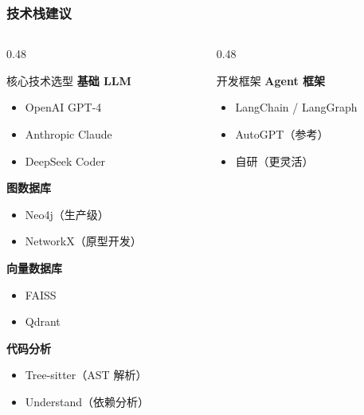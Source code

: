\documentclass[aspectratio=169,10pt]{beamer}
\begin{document}
\begin{frame}
  \frametitle{技术栈建议}

  \begin{columns}[T]
    \begin{column}{0.48\textwidth}
      \begin{block}{核心技术选型}
        \footnotesize
        \textbf{基础 LLM}
        \begin{itemize}
          \item OpenAI GPT-4
          \item Anthropic Claude
          \item DeepSeek Coder
        \end{itemize}

        \vspace{0.2cm}

        \textbf{图数据库}
        \begin{itemize}
          \item Neo4j（生产级）
          \item NetworkX（原型开发）
        \end{itemize}

        \vspace{0.2cm}

        \textbf{向量数据库}
        \begin{itemize}
          \item FAISS
          \item Qdrant
        \end{itemize}

        \vspace{0.2cm}

        \textbf{代码分析}
        \begin{itemize}
          \item Tree-sitter（AST 解析）
          \item Understand（依赖分析）
        \end{itemize}
      \end{block}
    \end{column}

    \begin{column}{0.48\textwidth}
      \begin{block}{开发框架}
        \footnotesize
        \textbf{Agent 框架}
        \begin{itemize}
          \item LangChain / LangGraph
          \item AutoGPT（参考）
          \item 自研（更灵活）
        \end{itemize}


\end{block}
\end{column}
\end{columns}
\end{frame}
\end{document}
